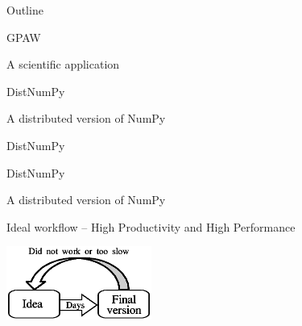 \documentclass{beamer}
\begin{document}
\begin{frame}{Outline}
\begin{center}
\begin{Large}
GPAW
\end{Large}

\vspace{3px}
\begin{small}
A scientific application
\end{small}

\vspace{30px}
\begin{Large}
DistNumPy
\end{Large}


\vspace{3px}
\begin{small}
A distributed version of NumPy
\end{small}
\end{center}
\end{frame}


\begin{frame}{DistNumPy}
\begin{center}
\begin{Huge}
DistNumPy
\end{Huge}

\vspace{7px}
A distributed version of NumPy

\vspace{25px}
\begin{scriptsize}
Ideal workflow -- High Productivity and High Performance
\end{scriptsize}
\includegraphics[width=180px]{../gfx/workflow2}
\end{center}
\end{frame}

\end{document}
